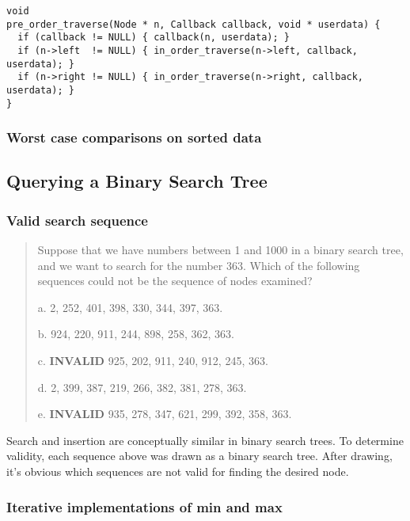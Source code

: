 \documentclass{article}
\begin{document}
\begin{lstlisting}[frame=single,title=Pre-order traverse]
void
pre_order_traverse(Node * n, Callback callback, void * userdata) {
  if (callback != NULL) { callback(n, userdata); }
  if (n->left  != NULL) { in_order_traverse(n->left, callback, userdata); }
  if (n->right != NULL) { in_order_traverse(n->right, callback, userdata); }
}
\end{lstlisting}


\subsubsection{Worst case comparisons on sorted data}


\subsection{Querying a Binary Search Tree}

\subsubsection{Valid search sequence}

\begin{quote}
Suppose that we have numbers between 1 and 1000 in a binary search tree, and we
want to search for the number 363. Which of the following sequences could not be
the sequence of nodes examined?

a. 2, 252, 401, 398, 330, 344, 397, 363.

b. 924, 220, 911, 244, 898, 258, 362, 363.

c. \textbf{INVALID} 925, 202, 911, 240, 912, 245, 363.

d. 2, 399, 387, 219, 266, 382, 381, 278, 363.

e. \textbf{INVALID} 935, 278, 347, 621, 299, 392, 358, 363.
\end{quote}

Search and insertion are conceptually similar in binary search
trees. To determine validity, each sequence above was drawn as
a binary search tree. After drawing, it's obvious which sequences
are not valid for finding the desired node.

\subsubsection{Iterative implementations of min and max}
\end{document}
